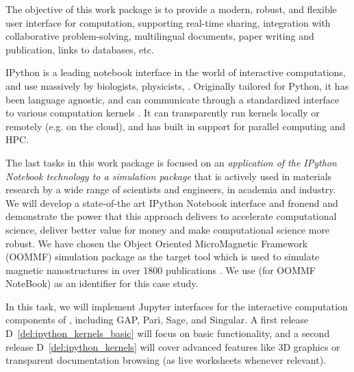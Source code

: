 \begin{workpackage}[id=UI,wphases=24-48,
  title=User Interfaces,
  PSRM=1,
  JURM=12, %
  LLRM=1, %
  SARM=1, %
  UKRM=1, %
  UBRM=1, %
  USORM=25] %

\begin{wpobjectives}
  The objective of this work package is to provide a modern, robust,
  and flexible user interface for computation, supporting real-time
  sharing, integration with collaborative problem-solving,
  multilingual documents, paper writing and publication, links to
  databases, etc.
\end{wpobjectives}

\begin{wpdescription}


  IPython is a leading notebook interface in the world of interactive
  computations, and use massively by biologists, physicists, . Originally tailored for Python, it has been
  language agnostic, and can communicate through a standardized
  interface to various computation kernels . It can
  transparently run kernels locally or remotely (e.g. on the cloud),
  and has built in support for parallel computing and HPC.

  The last tasks in this work package is focused on an
  \emph{application of the IPython Notebook technology to a simulation
    package} that is actively used in materials research by a wide
  range of scientists and engineers, in academia and industry. We will
  develop a state-of-the art IPython Notebook interface and fronend
  and demonstrate the power that this approach delivers to accelerate
  computational science, deliver better value for money and make
  computational science more robust.  We have chosen the Object
  Oriented MicroMagnetic Framework (OOMMF) simulation package
  \cite{OOMMF-url} as the target tool which is used to simulate
  magnetic nanostructures in over 1800 publications
  \cite{OOMMF-citations-url}. We use \OOMMFNB{} (for OOMMF NoteBook) as
  an identifier for this case study.

\end{wpdescription}

\begin{tasklist}
\begin{task}[title=Uniform notebook interface for all interactive components]
  \label{task.ipython_kernels}
  In this task, we will implement Jupyter interfaces for the
  interactive computation components of \TheProject, including GAP,
  Pari, Sage, and Singular. A first release
  D~\ref{del:ipython_kernels_basic} will focus on basic functionality,
  and a second release D~\ref{del:ipython_kernels} will cover advanced
  features like 3D graphics or transparent documentation browsing (as
  live worksheets whenever relevant).


\end{task}
\end{tasklist}
\end{workpackage}
